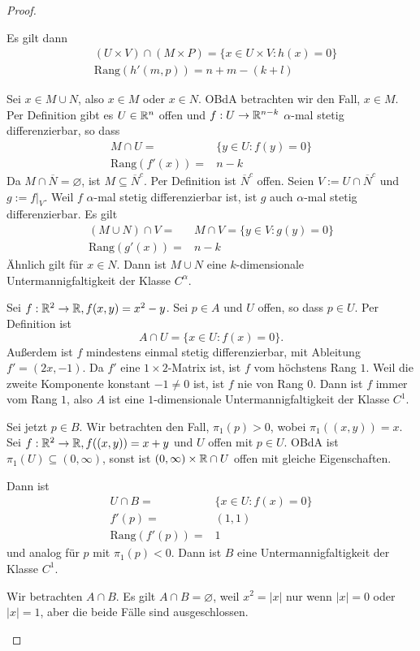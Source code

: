 \begin{proof}
\begin{parts}
Es gilt dann
\begin{align*}
	&(U\times V)\cap (M\times P)=\{x\in U\times V:h(x)=0\} \\
	&\text{Rang}(h'(m,p))=n+m-(k+l)
\end{align*}
\item Sei $x\in M\cup N$, also $x\in M$ oder $x\in N$. OBdA betrachten wir den Fall, $x\in M$. Per Definition gibt es $U\in \mathbb{R}^n$ offen und $f:U\to \mathbb{R}^{n-k}$ $\alpha$-mal stetig differenzierbar, so dass
	\begin{align*}
		M\cap U=&\{y\in U:f(y)=0\} \\
		\text{Rang}(f'(x))=&n-k
	\end{align*}
	Da $M\cap \overline{N}=\varnothing$, ist $M\subseteq \overline{N}^c$. Per Definition ist $\overline{N}^c$ offen. Seien $V:=U\cap \overline{N}^c$ und $g:=f|_V$. Weil $f$ $\alpha$-mal stetig differenzierbar ist, ist $g$ auch $\alpha$-mal stetig differenzierbar. Es gilt
	\begin{align*}
		(M\cup N)\cap V=&M\cap V=\{y\in V:g(y)=0\} \\
		\text{Rang}(g'(x))=&n-k
	\end{align*}
	Ähnlich gilt f\"{u}r $x\in N$. Dann ist $M\cup N$ eine $k$-dimensionale Untermannigfaltigkeit der Klasse $C^\alpha$.
\item Sei $f:\mathbb{R}^2\to \mathbb{R}, f(x,y)=x^2-y$. Sei $p\in A$ und $U$ offen, so dass $p\in U$. Per Definition ist
	\[
	A\cap U=\{x\in U: f(x)=0\} 
	.\] 
	Außerdem ist $f$ mindestens einmal stetig differenzierbar, mit Ableitung $f'=(2x,-1)$. Da $f'$ eine $1\times 2$-Matrix ist, ist $f$ vom höchstens Rang $1$. Weil die zweite Komponente konstant $-1\neq 0$ ist, ist $f$ nie von Rang $0$. Dann ist $f$ immer vom Rang $1$, also $A$ ist eine $1$-dimensionale Untermannigfaltigkeit der Klasse $C^1$.

	Sei jetzt $p\in B$. Wir betrachten den Fall, $\pi_1(p)>0$, wobei $\pi_1((x,y))=x$. Sei $f:\mathbb{R}^2\to \mathbb{R}, f((x,y))=x+y$ und $U$ offen mit $p\in U$. OBdA ist $\pi_1(U)\subseteq (0,\infty)$, sonst ist $(0,\infty)\times \mathbb{R} \cap U$ offen mit gleiche Eigenschaften.

	Dann ist
	\begin{align*}
		U\cap B=&\{x\in U:f(x)=0\} \\
		f'(p)=&(1,1)\\
		\text{Rang}(f'(p))=&1
	\end{align*}
	und analog f\"{u}r $p$ mit $\pi_1(p)<0$. Dann ist $B$ eine Untermannigfaltigkeit der Klasse $C^1$.
\item Wir betrachten $A\cap B$. Es gilt $A\cap B=\varnothing$, weil $x^2=|x|$ nur wenn $|x|=0$ oder $|x|=1$, aber die beide Fälle sind ausgeschlossen.


\end{parts}
\end{proof}
